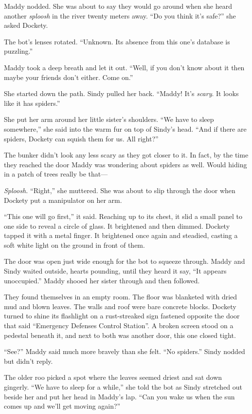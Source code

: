 \documentclass[10pt]{article}
\begin{document}
Maddy nodded. She was about to say they would go around when she heard
another \emph{sploosh} in the river twenty meters away. ``Do you think
it's safe?'' she asked Dockety.

The bot's lenses rotated. ``Unknown. Its absence from this one's
database is puzzling.''

Maddy took a deep breath and let it out. ``Well, if you don't know about
it then maybe your friends don't either. Come on.''

She started down the path. Sindy pulled her back. ``Maddy! It's
\emph{scary}. It looks like it has spiders.''

She put her arm around her little sister's shoulders. ``We have to sleep
somewhere,'' she said into the warm fur on top of Sindy's head. ``And if
there are spiders, Dockety can squish them for us. All right?''

The bunker didn't look any less scary as they got closer to it. In fact,
by the time they reached the door Maddy was wondering about spiders as
well. Would hiding in a patch of trees really be that---

\emph{Sploosh.} ``Right,'' she muttered. She was about to slip through
the door when Dockety put a manipulator on her arm.

``This one will go first,'' it said. Reaching up to its chest, it slid a
small panel to one side to reveal a circle of glass. It brightened and
then dimmed. Dockety tapped it with a metal finger. It brightened once
again and steadied, casting a soft white light on the ground in front of
them.

The door was open just wide enough for the bot to squeeze through. Maddy
and Sindy waited outside, hearts pounding, until they heard it say, ``It
appears unoccupied.'' Maddy shooed her sister through and then followed.

They found themselves in an empty room. The floor was blanketed with
dried mud and blown leaves. The walls and roof were bare concrete
blocks. Dockety turned to shine its flashlight on a rust-streaked sign
fastened opposite the door that said ``Emergency Defenses Control
Station''. A broken screen stood on a pedestal beneath it, and next to
both was another door, this one closed tight.

``See?'' Maddy said much more bravely than she felt. ``No spiders.''
Sindy nodded but didn't reply.

The older roo picked a spot where the leaves seemed driest and sat down
gingerly. ``We have to sleep for a while,'' she told the bot as Sindy
stretched out beside her and put her head in Maddy's lap. ``Can you wake
us when the sun comes up and we'll get moving again?''
\end{document}
